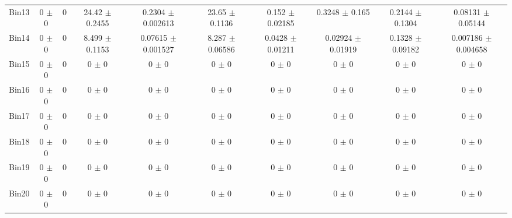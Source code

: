 \begin{tabular}{@{\extracolsep{4pt}}lccccccccc@{}}
     Bin13 & 0 $\pm$ 0 & 0 & 24.42 $\pm$ 0.2455 & 0.2304 $\pm$ 0.002613 & 23.65 $\pm$ 0.1136 & 0.152 $\pm$ 0.02185 & 0.3248 $\pm$ 0.165 & 0.2144 $\pm$ 0.1304 & 0.08131 $\pm$ 0.05144 \\ 
     Bin14 & 0 $\pm$ 0 & 0 & 8.499 $\pm$ 0.1153 & 0.07615 $\pm$ 0.001527 & 8.287 $\pm$ 0.06586 & 0.0428 $\pm$ 0.01211 & 0.02924 $\pm$ 0.01919 & 0.1328 $\pm$ 0.09182 & 0.007186 $\pm$ 0.004658 \\ 
     Bin15 & 0 $\pm$ 0 & 0 & 0 $\pm$ 0 & 0 $\pm$ 0 & 0 $\pm$ 0 & 0 $\pm$ 0 & 0 $\pm$ 0 & 0 $\pm$ 0 & 0 $\pm$ 0 \\ 
     Bin16 & 0 $\pm$ 0 & 0 & 0 $\pm$ 0 & 0 $\pm$ 0 & 0 $\pm$ 0 & 0 $\pm$ 0 & 0 $\pm$ 0 & 0 $\pm$ 0 & 0 $\pm$ 0 \\ 
     Bin17 & 0 $\pm$ 0 & 0 & 0 $\pm$ 0 & 0 $\pm$ 0 & 0 $\pm$ 0 & 0 $\pm$ 0 & 0 $\pm$ 0 & 0 $\pm$ 0 & 0 $\pm$ 0 \\ 
     Bin18 & 0 $\pm$ 0 & 0 & 0 $\pm$ 0 & 0 $\pm$ 0 & 0 $\pm$ 0 & 0 $\pm$ 0 & 0 $\pm$ 0 & 0 $\pm$ 0 & 0 $\pm$ 0 \\ 
     Bin19 & 0 $\pm$ 0 & 0 & 0 $\pm$ 0 & 0 $\pm$ 0 & 0 $\pm$ 0 & 0 $\pm$ 0 & 0 $\pm$ 0 & 0 $\pm$ 0 & 0 $\pm$ 0 \\ 
     Bin20 & 0 $\pm$ 0 & 0 & 0 $\pm$ 0 & 0 $\pm$ 0 & 0 $\pm$ 0 & 0 $\pm$ 0 & 0 $\pm$ 0 & 0 $\pm$ 0 & 0 $\pm$ 0 \\ 
\hline\hline
  \end{tabular}
